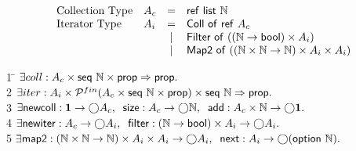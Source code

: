 \documentclass[preprint,natbib]{sigplanconf}
\begin{document}
{\small
\begin{displaymath}
\begin{array}{llcl}
\mbox{Collection Type} & 
A_c & = & \mbox{\textsf{{ref }}}\mbox{\textsf{{list }}}{\mathbb{N}} \\
\mbox{Iterator Type} &
A_i & = & \mbox{\textsf{{Coll of }}}\mbox{\textsf{{ref }}}A_c \\
&   & | & \mbox{\textsf{{Filter of }}}((\mathbb{N} \to \mbox{\textsf{{bool}}}) \times A_i) \\
&   & | & \mbox{\textsf{{Map2 of }}}((\mathbb{N} \times \mathbb{N} \to \mathbb{N}) \times A_i \times A_i) \\
\end{array}
\end{displaymath}
\begin{tabbing}
1 \qquad \= $\exists coll : A_c \times \mbox{\textsf{{seq }}}{\mathbb{N}} \times \mbox{\textsf{{prop}}} \Rightarrow \mbox{\textsf{{prop}}}.$ \\
2 \> 
$\exists iter : A_i \times \mathcal{P}^{fin}(A_c \times \mbox{\textsf{{seq }}}{\mathbb{N}} \times \mbox{\textsf{{prop}}}) \times \mbox{\textsf{{seq }}}{\mathbb{N}} \Rightarrow \mbox{\textsf{{prop}}}.$ \\
3 \> 
$\exists \mbox{\textsf{{newcoll}}} : \mathbf{1} \to \bigcirc{A_c}, \;\;
         \mbox{\textsf{{size}}} : A_c \to \bigcirc{\mathbb{N}}, \;\;
         \mbox{\textsf{{add}}} : A_c \times \mathbb{N} \to \bigcirc{\mathbf{1}}.$\\
4 \> 
$\exists \mbox{\textsf{{newiter}}} : A_c \to \bigcirc{A_i}, \;\;
          \mbox{\textsf{{filter}}} : (\mathbb{N} \to \mbox{\textsf{{bool}}}) \times A_i  \to \bigcirc{A_i}.$ \\
5 \> 
$\exists$\=$ \mbox{\textsf{{map2}}} : (\mathbb{N} \times \mathbb{N} \to \mathbb{N}) \times A_i \times A_i \to \bigcirc{A_i}, \;\;
              \mbox{\textsf{{next}}} : A_i \to \bigcirc{(\mbox{\textsf{{option }}}{\mathbb{N}})}.$  \\[0.5em]


\end{tabbing}}
\end{document}
